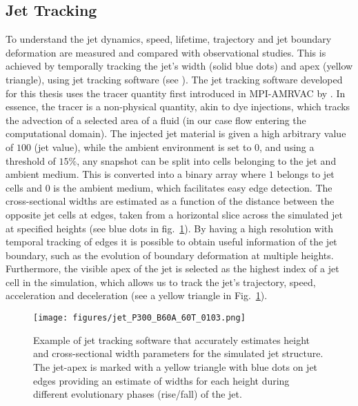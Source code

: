 \subsection{Jet Tracking}
\label{subsec:jet_tracking}
To understand the jet dynamics, speed, lifetime, trajectory and jet boundary deformation are measured and compared with observational studies. This is achieved by temporally tracking the jet's width (solid blue dots) and apex (yellow triangle), using jet tracking software (see ). The jet tracking software developed for this thesis uses the tracer quantity first introduced in MPI-AMRVAC by \cite{Porth_2014}. In essence, the tracer is a non-physical quantity, akin to dye injections, which tracks the advection of a selected area of a fluid (in our case flow entering the computational domain). The injected jet material is given a high arbitrary value of $100$ (jet value), while the ambient environment is set to $0$, and using a threshold of $15\%$, any snapshot can be split into cells belonging to the jet and ambient medium. This is converted into a binary array where $1$ belongs to jet cells and $0$ is the ambient medium, which facilitates easy edge detection. The cross-sectional widths are estimated as a function of the distance between the opposite jet cells at edges, taken from a horizontal slice across the simulated jet at specified heights (see blue dots in fig.~\ref{jet_tracker}). By having a high resolution with temporal tracking of edges it is possible to obtain useful information of the jet boundary, such as the evolution of boundary deformation at multiple heights. Furthermore, the visible apex of the jet is selected as the highest index of a jet cell in the simulation, which allows us to track the jet's trajectory, speed, acceleration and deceleration (see a yellow triangle in Fig.~\ref{jet_tracker}).
\begin{figure}
\centering
{\texttt{[image: figures/jet\_P300\_B60A\_60T\_0103.png]}}
\caption{Example of jet tracking software that accurately estimates height and cross-sectional width parameters for the simulated jet structure. The jet-apex is marked with a yellow triangle with blue dots on jet edges providing an estimate of widths for each height during different evolutionary phases (rise/fall) of the jet.}
\label{jet_tracker}
\end{figure}


